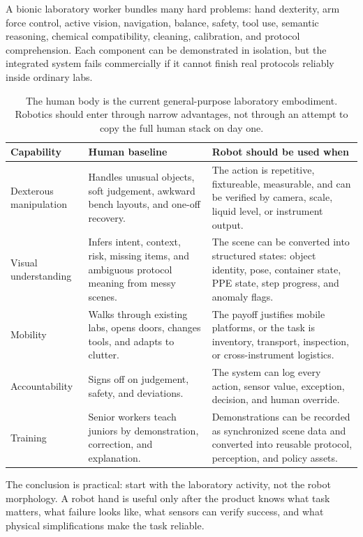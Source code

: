 \documentclass[11pt]{article}
\begin{document}
A bionic laboratory worker bundles many hard problems: hand dexterity, arm force control, active vision, navigation, balance, safety, tool use, semantic reasoning, chemical compatibility, cleaning, calibration, and protocol comprehension. Each component can be demonstrated in isolation, but the integrated system fails commercially if it cannot finish real protocols reliably inside ordinary labs.

\begin{table}[htbp]
\centering
\small
\begin{tabularx}{\linewidth}{@{}L{2.65cm}Y Y@{}}
\toprule
\textbf{Capability} & \textbf{Human baseline} & \textbf{Robot should be used when} \\
\midrule
Dexterous manipulation & Handles unusual objects, soft judgement, awkward bench layouts, and one-off recovery. & The action is repetitive, fixtureable, measurable, and can be verified by camera, scale, liquid level, or instrument output. \\
Visual understanding & Infers intent, context, risk, missing items, and ambiguous protocol meaning from messy scenes. & The scene can be converted into structured states: object identity, pose, container state, PPE state, step progress, and anomaly flags. \\
Mobility & Walks through existing labs, opens doors, changes tools, and adapts to clutter. & The payoff justifies mobile platforms, or the task is inventory, transport, inspection, or cross-instrument logistics. \\
Accountability & Signs off on judgement, safety, and deviations. & The system can log every action, sensor value, exception, decision, and human override. \\
Training & Senior workers teach juniors by demonstration, correction, and explanation. & Demonstrations can be recorded as synchronized scene data and converted into reusable protocol, perception, and policy assets. \\
\bottomrule
\end{tabularx}
\caption{The human body is the current general-purpose laboratory embodiment. Robotics should enter through narrow advantages, not through an attempt to copy the full human stack on day one.}
\label{tab:human-robot-comparison}
\end{table}

The conclusion is practical: start with the laboratory activity, not the robot morphology. A robot hand is useful only after the product knows what task matters, what failure looks like, what sensors can verify success, and what physical simplifications make the task reliable.
\end{document}
